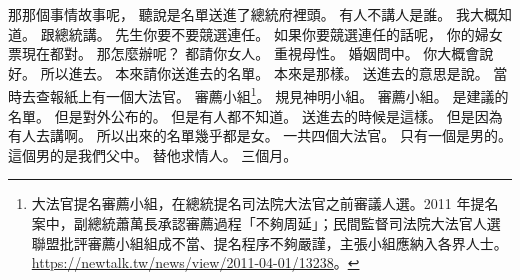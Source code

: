 \hypertarget{c01:cue:3333}{}那那個事情故事呢，
\hypertarget{c01:cue:3334}{}聽說是名單送進了總統府裡頭。
\hypertarget{c01:cue:3335}{}有人不講人是誰。
\hypertarget{c01:cue:3336}{}我大概知道。
\hypertarget{c01:cue:3337}{}跟總統講。
\hypertarget{c01:cue:3338}{}先生你要不要競選連任。
\hypertarget{c01:cue:3339}{}如果你要競選連任的話呢，
\hypertarget{c01:cue:3340}{}你的婦女票現在都對。
\hypertarget{c01:cue:3341}{}那怎麼辦呢？
\hypertarget{c01:cue:3342}{}都請你女人。
\hypertarget{c01:cue:3343}{}重視母性。
\hypertarget{c01:cue:3344}{}婚姻問中。
\hypertarget{c01:cue:3345}{}你大概會說好。
\hypertarget{c01:cue:3346}{}所以進去。
\hypertarget{c01:cue:3347}{}本來請你送進去的名單。
\hypertarget{c01:cue:3348}{}本來是那樣。
\hypertarget{c01:cue:3349}{}送進去的意思是說。
\hypertarget{c01:cue:3350}{}當時去查報紙上有一個大法官。
\hypertarget{c01:cue:3351}{}審薦小組\footnote{大法官提名審薦小組，在總統提名司法院大法官之前審議人選。2011 年提名案中，副總統蕭萬長承認審薦過程「不夠周延」；民間監督司法院大法官人選聯盟批評審薦小組組成不當、提名程序不夠嚴謹，主張小組應納入各界人士。\url{https://newtalk.tw/news/view/2011-04-01/13238}。}。
\hypertarget{c01:cue:3352}{}規見神明小組。
\hypertarget{c01:cue:3353}{}審薦小組。
\hypertarget{c01:cue:3354}{}是建議的名單。
\hypertarget{c01:cue:3355}{}但是對外公布的。
\hypertarget{c01:cue:3356}{}但是有人都不知道。
\hypertarget{c01:cue:3357}{}送進去的時候是這樣。
\hypertarget{c01:cue:3358}{}但是因為有人去講啊。
\hypertarget{c01:cue:3359}{}所以出來的名單幾乎都是女。
\hypertarget{c01:cue:3360}{}一共四個大法官。
\hypertarget{c01:cue:3361}{}只有一個是男的。
\hypertarget{c01:cue:3362}{}這個男的是我們父中。
\hypertarget{c01:cue:3363}{}替他求情人。
\hypertarget{c01:cue:3364}{}三個月。


